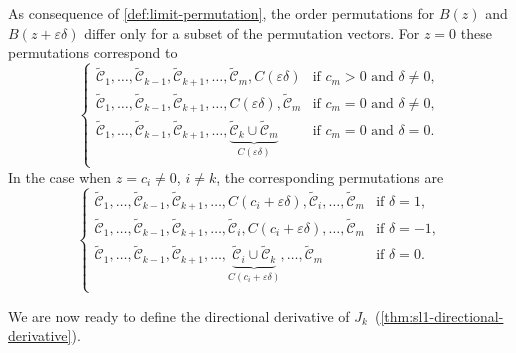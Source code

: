 \begin{remark}
  As consequence of \cref{def:limit-permutation}, the order
  permutations for \(B(z)\) and \(B(z + \varepsilon \delta)\) differ only for a subset of
  the permutation vectors. For \(z = 0\)
  these permutations correspond to
  \[
    \begin{cases}
      \tilde{\mathcal{C}}_1, \dots, \tilde{\mathcal{C}}_{k-1}, \tilde{\mathcal{C}}_{k+1}, \dots, \tilde{\mathcal{C}}_m, C(\varepsilon\delta)                                          & \text{if } c_m > 0 \text{ and } \delta \neq 0, \\
      \tilde{\mathcal{C}}_1, \dots, \tilde{\mathcal{C}}_{k-1}, \tilde{\mathcal{C}}_{k+1}, \dots, C(\varepsilon\delta), \tilde{\mathcal{C}}_m                                          & \text{if } c_m = 0 \text{ and } \delta \neq 0, \\
      \tilde{\mathcal{C}}_1, \dots, \tilde{\mathcal{C}}_{k-1}, \tilde{\mathcal{C}}_{k+1}, \dots, \underbrace{\tilde{\mathcal{C}}_k \cup \tilde{\mathcal{C}}_m}_{C(\varepsilon\delta)} & \text{if } c_m = 0 \text{ and } \delta = 0.    \\
    \end{cases}
  \]
  In the case when \(z = c_i \neq 0\), \(i \neq k\), the corresponding permutations are
  \[
    \begin{cases}
      \tilde{\mathcal{C}}_1, \dots, \tilde{\mathcal{C}}_{k-1}, \tilde{\mathcal{C}}_{k+1}, \dots, C(c_i + \varepsilon\delta), \tilde{\mathcal{C}}_i, \dots, \tilde{\mathcal{C}}_m                                          & \text{if } \delta = 1,  \\
      \tilde{\mathcal{C}}_1, \dots, \tilde{\mathcal{C}}_{k-1}, \tilde{\mathcal{C}}_{k+1}, \dots, \tilde{\mathcal{C}}_i, C(c_i + \varepsilon\delta), \dots, \tilde{\mathcal{C}}_m                                          & \text{if } \delta = -1, \\
      \tilde{\mathcal{C}}_1, \dots, \tilde{\mathcal{C}}_{k-1}, \tilde{\mathcal{C}}_{k+1}, \dots, \underbrace{\tilde{\mathcal{C}}_i \cup \tilde{\mathcal{C}}_k}_{C(c_i + \varepsilon\delta)}, \dots, \tilde{\mathcal{C}}_m & \text{if } \delta = 0.  \\
    \end{cases}
  \]
\end{remark}

We are now ready to define the directional derivative of \(J_k\)~(\cref{thm:sl1-directional-derivative}).

